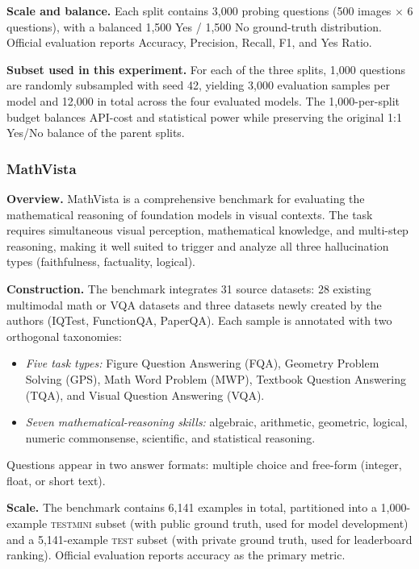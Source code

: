 \textbf{Scale and balance.}
Each split contains 3{,}000 probing questions
(500 images $\times$ 6 questions),
with a balanced 1{,}500 Yes / 1{,}500 No
ground-truth distribution.
Official evaluation reports Accuracy, Precision, Recall,
F1, and Yes Ratio.

\textbf{Subset used in this experiment.}
For each of the three splits,
1{,}000 questions are randomly subsampled
with seed 42,
yielding 3{,}000 evaluation samples per model
and 12{,}000 in total across the four evaluated models.
The 1{,}000-per-split budget balances
API-cost and statistical power
while preserving the original 1:1 Yes/No balance
of the parent splits.

\subsubsection{MathVista}

\textbf{Overview.}
MathVista \citep{luMathVistaEvaluatingMathematical2024}
is a comprehensive benchmark
for evaluating the mathematical reasoning of foundation models
in visual contexts.
The task requires simultaneous visual perception,
mathematical knowledge,
and multi-step reasoning,
making it well suited to trigger and analyze
all three hallucination types
(faithfulness, factuality, logical).

\textbf{Construction.}
The benchmark integrates 31 source datasets:
28 existing multimodal math or VQA datasets
and three datasets newly created by the authors
(IQTest, FunctionQA, PaperQA).
Each sample is annotated with two orthogonal taxonomies:
\begin{itemize}[leftmargin=*,topsep=0pt]
  \item \textit{Five task types:}
    Figure Question Answering (FQA),
    Geometry Problem Solving (GPS),
    Math Word Problem (MWP),
    Textbook Question Answering (TQA),
    and Visual Question Answering (VQA).
  \item \textit{Seven mathematical-reasoning skills:}
    algebraic, arithmetic, geometric, logical,
    numeric commonsense, scientific, and statistical reasoning.
\end{itemize}
Questions appear in two answer formats:
multiple choice and free-form
(integer, float, or short text).

\textbf{Scale.}
The benchmark contains 6{,}141 examples in total,
partitioned into a 1{,}000-example \textsc{testmini} subset
(with public ground truth, used for model development)
and a 5{,}141-example \textsc{test} subset
(with private ground truth, used for leaderboard ranking).
Official evaluation reports accuracy as the primary metric.


